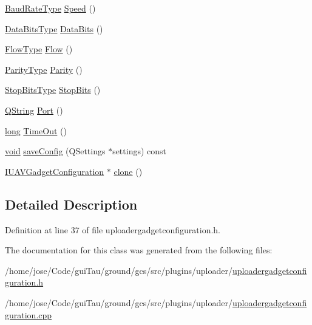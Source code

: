 \begin{DoxyCompactItemize}
\item 
\hyperlink{qextserialport_8h_a6f031169a6a9b150b5af707bb23cf010}{Baud\-Rate\-Type} \hyperlink{group___y_modem_uploader_ga3cd2d8faf40a9fcb60022843bf36171d}{Speed} ()
\item 
\hyperlink{qextserialport_8h_a189ef78c2c1b7537ab114d576f6214fa}{Data\-Bits\-Type} \hyperlink{group___y_modem_uploader_ga3bf92d26250fea27e32f58eaf761c9d7}{Data\-Bits} ()
\item 
\hyperlink{qextserialport_8h_a02ad1c7cf791a069dd54e409f8db4790}{Flow\-Type} \hyperlink{group___y_modem_uploader_gac453b5e5875eeb4c1ded9a780608a188}{Flow} ()
\item 
\hyperlink{qextserialport_8h_aee22d32d87c815090354bf9b8e957ace}{Parity\-Type} \hyperlink{group___y_modem_uploader_gabdb93d527f297834e083e424edf4843c}{Parity} ()
\item 
\hyperlink{qextserialport_8h_adc8078895cd941d755d46633b54d3e7f}{Stop\-Bits\-Type} \hyperlink{group___y_modem_uploader_ga8f7d119b9f954ce05995540ca957568c}{Stop\-Bits} ()
\item 
\hyperlink{group___u_a_v_objects_plugin_gab9d252f49c333c94a72f97ce3105a32d}{Q\-String} \hyperlink{group___y_modem_uploader_gabf25c5e3dabcb3c129987a2d266b73dc}{Port} ()
\item 
\hyperlink{ioapi_8h_a3c7b35ad9dab18b8310343c201f7b27e}{long} \hyperlink{group___y_modem_uploader_ga39f15ea85bd2c5de6f4a1a6d71f21032}{Time\-Out} ()
\item 
\hyperlink{group___u_a_v_objects_plugin_ga444cf2ff3f0ecbe028adce838d373f5c}{void} \hyperlink{group___y_modem_uploader_gade32c98be91417bbf87148f4629b5c18}{save\-Config} (Q\-Settings $\ast$settings) const 
\item 
\hyperlink{group___core_plugin_gacdfdf0b1e39b5002472b76b6564ce51f}{I\-U\-A\-V\-Gadget\-Configuration} $\ast$ \hyperlink{group___y_modem_uploader_gaf15392453c1ff2489f6e03d39d6338e8}{clone} ()
\end{DoxyCompactItemize}


\subsection{Detailed Description}


Definition at line 37 of file uploadergadgetconfiguration.\-h.



The documentation for this class was generated from the following files\-:\begin{DoxyCompactItemize}
\item 
/home/jose/\-Code/gui\-Tau/ground/gcs/src/plugins/uploader/\hyperlink{uploadergadgetconfiguration_8h}{uploadergadgetconfiguration.\-h}\item 
/home/jose/\-Code/gui\-Tau/ground/gcs/src/plugins/uploader/\hyperlink{uploadergadgetconfiguration_8cpp}{uploadergadgetconfiguration.\-cpp}\end{DoxyCompactItemize}
